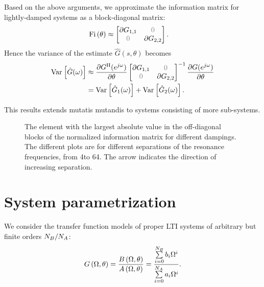 Based on the above arguments, we approximate the information matrix for lightly-damped systems as a block-diagonal matrix:
\begin{align}
\IF&\approx \begin{bmatrix}\partial G_{1,1} &\deemph{0}\\
                        \deemph{0}&\partial G_{2,2}\end{bmatrix}.
\end{align}
Hence the variance of the estimate $\hat{G}(s,\theta)$ becomes
\begin{align}
\var{\hat{G}(\omega)} &\approx \frac{\partial G^{\HT}(e^{j\omega})}{\partial \theta}\begin{bmatrix}\partial G_{1,1} &\deemph{0}\\
                        \deemph{0}&\partial G_{2,2}\end{bmatrix}^{-1}\frac{\partial G(e^{j\omega})}{\partial \theta}\\
&=\var{\hat{G}_1(\omega)} + \var{\hat{G}_2(\omega)}.
\end{align}

This results extends mutatis mutandis to systems consisting of more sub-systems.

\begin{figure}
\centering
\setlength{}
\setlength\figureheight{0.68\figurewidth}

\caption[Relative amplitudes of the off-diagonal blocks of the Fisher information matrix.]{The element with the largest absolute value in the off-diagonal blocks of the normalized information matrix for different dampings.
         The different plots are for different separations of the resonance frequencies, from 4\wdB to 64\wdB.
         The arrow indicates the direction of increasing separation.}
\label{fig:excitation:coupling}
\end{figure}

\section{System parametrization} 
\label{sec:excitation:parametrization}

  We consider the transfer function models of proper \gls{LTI} systems of arbitrary but finite orders $N_{B} / N_{A}$:
  \begin{align}
    G\left( \Omega, \theta \right) 
    = \frac{B\left( \Omega,\theta \right)}
                  {A\left( \Omega,\theta \right)}
    = \frac{\sum\limits_{i=0}^{N_{B}} b_i \Omega^i}
                  {\sum\limits_{i=0}^{N_{A}} a_i \Omega^i}
    \text{.} 
    \label{eq:excitation:model}
  \end{align}
  
